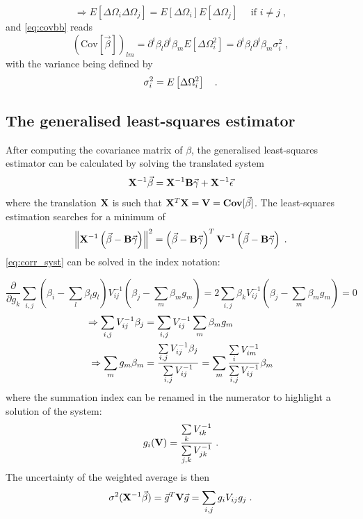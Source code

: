%
%
\begin{equation}
\Rightarrow E\left[\Delta\Omega_i\Delta\Omega_j\right] = E\left[\Delta\Omega_i\right]E\left[\Delta\Omega_j\right]\quad \text{ if } i \neq j\;,
\end{equation}
%
and \eqref{eq:covbb} reads
%
\begin{equation}
(\text{Cov}[\vec{\beta}])_{lm} = \partial^i\beta_l\partial^i\beta_mE[\Delta\Omega_i^2] = \partial^i\beta_l\partial^i\beta_m \sigma_i^2\;,
\end{equation}
%
with the variance being defined by
%
\begin{equation}
\sigma_i^2 = E\left[\Delta\Omega_i^2\right]
\quad .
\end{equation}
%
\subsection{The generalised least-squares estimator}

After computing the covariance matrix of $ \beta $, the generalised least-squares estimator can be calculated
by solving the translated system
%
\begin{equation}
\mathbf{X}^{-1} \vec{\beta} = \mathbf{X}^{-1}\mathbf{B}\vec{\gamma} + \mathbf{X}^{-1}\vec{\epsilon}
\end{equation}
%
where the translation $ \mathbf{X} $ is such that $ \mathbf{X}^T\mathbf{X} = \mathbf{V} = \mathbf{Cov}[\vec{\beta}] $. The least-squares estimation searches for a minimum of 
%
\begin{equation}
\left\|\mathbf{X}^{-1}\left(\vec{\beta} - \mathbf{B}\vec{\gamma}\right)\right\|^2 = \left(\vec{\beta} - \mathbf{B}\vec{\gamma}\right)^T \mathbf{V}^{-1}\left(\vec{\beta} - \mathbf{B}\vec{\gamma}\right)\;.
\label{eq:corr_syst}
\end{equation}
%
\eqref{eq:corr_syst} can be solved in the index notation:

\[\frac{\partial}{\partial g_k}\sum\limits_{i,j} \left(\beta_i - \sum_l\beta_lg_l\right) V_{ij}^{-1} \left(\beta_j-\sum_m\beta_mg_m\right) = 2\sum_{i,j}\beta_kV_{ij}^{-1}\left(\beta_j - \sum_m\beta_mg_m\right) = 0\]
%
\begin{align}
\Rightarrow \sum_{i,j}V_{ij}^{-1}\beta_j&=\sum_{i,j}V_{ij}^{-1}\sum_m\beta_mg_m\notag \\
\Rightarrow\sum_mg_m\beta_m &= \frac{\sum\limits_{i,j}V_{ij}^{-1}\beta_j}{\sum\limits_{i,j}V_{ij}^{-1}}=\sum_m \frac{\sum\limits_i V_{im}^{-1}}{\sum\limits_{i,j}V_{ij}^{-1}}\beta_m
\end{align}
%
 where the summation index can be renamed in the numerator to highlight a solution of the system:
%
\begin{equation}
g_i(\mathbf{V}) = \frac{\sum\limits_k V_{ik}^{-1}}{\sum\limits_{j,k}V_{jk}^{-1}}\; .
\end{equation}
%
The uncertainty of the weighted average is then
%
\begin{equation}
\sigma^2(\mathbf{X}^{-1}\vec{\beta}) = \vec{g}^T\mathbf{V}\vec{g} = \sum\limits_{i,j}g_iV_{ij}g_j\;.
\end{equation}
%
